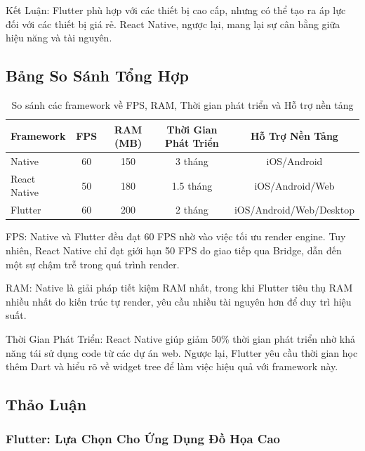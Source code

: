   
      Kết Luận: Flutter phù hợp với các thiết bị cao cấp, nhưng có thể tạo ra áp lực đối với các thiết bị giá rẻ. React Native, ngược lại, mang lại sự cân bằng giữa hiệu năng và tài nguyên.

\subsection{Bảng So Sánh Tổng Hợp}
\renewcommand{\labelitemi}{--}    
\begin{table}[H]
  \centering
  \begin{tabular}{|l|c|c|c|c|}
  \hline
  \textbf{Framework} & \textbf{FPS} & \textbf{RAM (MB)} & \textbf{Thời Gian Phát Triển} & \textbf{Hỗ Trợ Nền Tảng} \\
  \hline
  Native       & 60          & 150               & 3 tháng                      & iOS/Android \\
  React Native & 50          & 180               & 1.5 tháng                    & iOS/Android/Web \\
  Flutter      & 60          & 200               & 2 tháng                      & iOS/Android/Web/Desktop \\
  \hline
  \end{tabular}
  \caption{So sánh các framework về FPS, RAM, Thời gian phát triển và Hỗ trợ nền tảng}
  \end{table}
  

  
      FPS: Native và Flutter đều đạt 60 FPS nhờ vào việc tối ưu render engine. Tuy nhiên, React Native chỉ đạt giới hạn 50 FPS do giao tiếp qua Bridge, dẫn đến một sự chậm trễ trong quá trình render.
  \vspace{0.5em}

  
      RAM: Native là giải pháp tiết kiệm RAM nhất, trong khi Flutter tiêu thụ RAM nhiều nhất do kiến trúc tự render, yêu cầu nhiều tài nguyên hơn để duy trì hiệu suất.
  \vspace{0.5em}

  
      Thời Gian Phát Triển: React Native giúp giảm 50\% thời gian phát triển nhờ khả năng tái sử dụng code từ các dự án web. Ngược lại, Flutter yêu cầu thời gian học thêm Dart và hiểu rõ về widget tree để làm việc hiệu quả với framework này.

\subsection{Thảo Luận}
\renewcommand{\labelitemi}{--}    
\subsubsection{Flutter: Lựa Chọn Cho Ứng Dụng Đồ Họa Cao}

